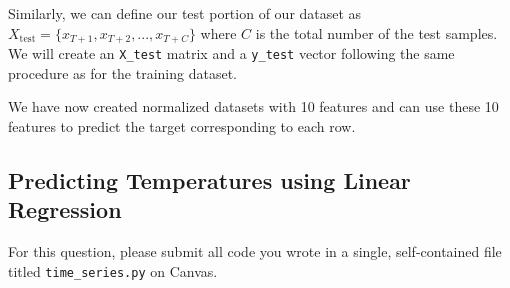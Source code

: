 Similarly, we can define our test portion of our dataset as $X_{\mathrm{test}} = \{x_{T+1}, x_{T+2}, ... ,x_{T+C} \}$ where $C$ is the total number of the test samples. We will create an \texttt{X\_test} matrix and a \texttt{y\_test} vector following the same procedure as for the training dataset. 


We have now created normalized datasets with 10 features and can use these 10 features to predict the target corresponding to each row. 

\clearpage

\subsection{Predicting Temperatures using Linear Regression}

For this question, please submit all code you wrote in a single, self-contained file titled \texttt{time\_series.py} on Canvas.

